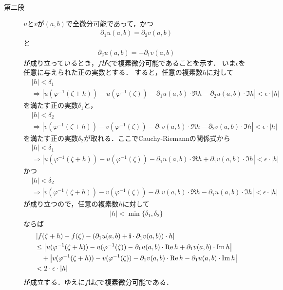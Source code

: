 \begin{sketch}
\begin{description}
			\item[第二段]
				$u$と$v$が$(a,b)$で全微分可能であって，かつ
				\begin{align}
					\partial_1 u(a,b) = \partial_2 v(a,b)
				\end{align}
				と
				\begin{align}
					\partial_2 u(a,b) = -\partial_1 v(a,b)
				\end{align}
				が成り立っているとき，$f$が$\zeta$で複素微分可能であることを示す．
				いま$\epsilon$を任意に与えられた正の実数とする．
				すると，任意の複素数$h$に対して
				\begin{align}
					&|h| < \delta_1  \\
					&\Longrightarrow
					\left|u(\varphi^{-1}(\zeta+h)) - u(\varphi^{-1}(\zeta)) 
					- \partial_1 u(a,b) \cdot \Re{h} - \partial_2 u(a,b) \cdot \Im{h}\right| < \epsilon \cdot |h|
				\end{align}
				を満たす正の実数$\delta_1$と，
				\begin{align}
					&|h| < \delta_2 \\
					&\Longrightarrow
					\left|v(\varphi^{-1}(\zeta+h)) - v(\varphi^{-1}(\zeta)) 
					- \partial_1 v(a,b) \cdot \Re{h} - \partial_2 v(a,b) \cdot \Im{h}\right| < \epsilon \cdot |h|
				\end{align}
				を満たす正の実数$\delta_2$が取れる．ここでCauchy-Riemannの関係式から
				\begin{align}
					&|h| < \delta_1 \\
					&\Longrightarrow
					\left|u(\varphi^{-1}(\zeta+h)) - u(\varphi^{-1}(\zeta)) 
					- \partial_1 u(a,b) \cdot \Re{h} + \partial_1 v(a,b) \cdot \Im{h}\right| < \epsilon \cdot |h|
				\end{align}
				かつ
				\begin{align}
					&|h| < \delta_2 \\
					&\Longrightarrow
					\left|v(\varphi^{-1}(\zeta+h)) - v(\varphi^{-1}(\zeta)) 
					- \partial_1 v(a,b) \cdot \Re{h} - \partial_1 u(a,b) \cdot \Im{h}\right| < \epsilon \cdot |h|
				\end{align}
				が成り立つので，任意の複素数$h$に対して
				\begin{align}
					|h| < \min{\{\delta_1,\delta_2\}}
				\end{align}
				ならば
				\begin{align}
					&\left|f(\zeta+h) - f(\zeta) - (\partial_1 u(a,b) + \mathbf{i} \cdot \partial_1 v(a,b)) \cdot h\right| \\
					&\leq \left|u(\varphi^{-1}(\zeta+h)) - u(\varphi^{-1}(\zeta)) 
					- \partial_1 u(a,b) \cdot \operatorname{Re} h + \partial_1 v(a,b) \cdot \operatorname{Im} h\right| \\
					&\quad + \left|v(\varphi^{-1}(\zeta+h)) - v(\varphi^{-1}(\zeta)) 
					- \partial_1 v(a,b) \cdot \operatorname{Re} h - \partial_1 u(a,b) \cdot \operatorname{Im} h\right| \\
					&< 2 \cdot \epsilon \cdot |h|
				\end{align}
				が成立する．ゆえに$f$は$\zeta$で複素微分可能である．
				\QED
		\end{description}
	\end{sketch}
	
